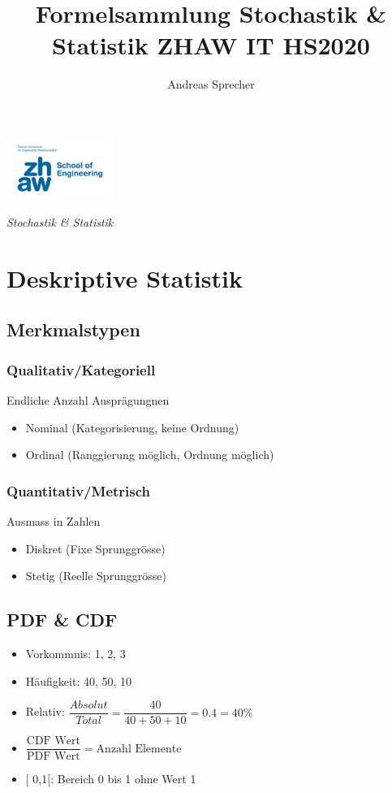 \documentclass[8pt,a4paper]{scrartcl}
\title{Formelsammlung Stochastik & Statistik ZHAW IT HS2020}
\author{Andreas Sprecher}
\begin{document}
\begin{multicols*}{3}
\setlength{\columnseprule}{0.4pt}
    \parbox{4cm}{
        \includegraphics[height=2cm]{./img/Logo.jpeg}
    }
    \parbox{4cm}{
        \emph{\Large{Stochastik \& Statistik}}
    }
    \vspace{-2mm} 

    \section{Deskriptive Statistik}
    		\subsection{Merkmalstypen}
    			\subsubsection{Qualitativ/Kategoriell}
    				Endliche Anzahl Ausprägungnen
    				\begin{itemize}\itemsep0pt				
					\item Nominal (Kategorisierung, keine Ordnung)
					\item Ordinal (Ranggierung möglich, Ordnung möglich)
				\end{itemize}
    			\subsubsection{Quantitativ/Metrisch}
    				Ausmass in Zahlen
    				\begin{itemize}\itemsep0pt				
					\item Diskret (Fixe Sprunggrösse)
					\item Stetig (Reelle Sprunggrösse)
				\end{itemize}
		\subsection{PDF \& CDF}
			\begin{itemize}\itemsep0pt				
				\item Vorkommnis: 1, 2, 3
				\item Häufigkeit: 40, 50, 10
				\item Relativ: $\dfrac{Absolut}{Total} = \dfrac{40}{40+50+10} = 0.4 = 40 \%$
				\item $\dfrac{\textrm{CDF Wert}}{\textrm{PDF Wert}} = \textrm{Anzahl Elemente}$
				\item $[$ 0,1$[$: Bereich 0 bis 1 ohne Wert 1
			\end{itemize}		


\end{multicols*}
\end{document}
